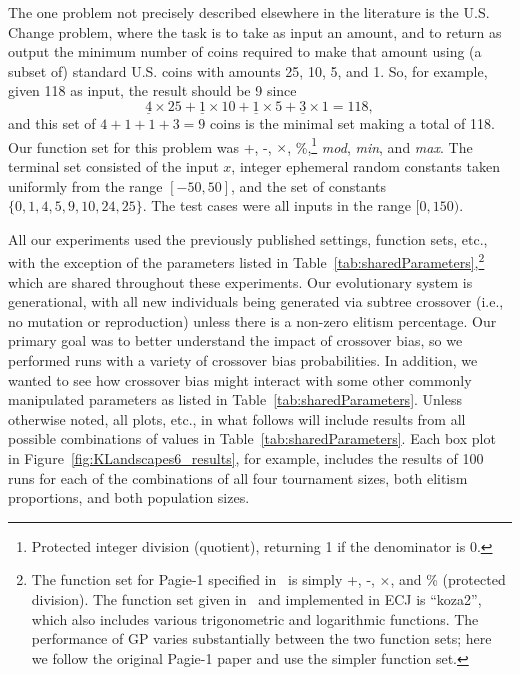 \documentclass{sig-alternate}
\begin{document}
The one problem not precisely described elsewhere in the literature is the U.S. Change problem, where the task is to
take as input an amount, and to return as output the minimum number of coins required to make that amount using (a
subset of) standard U.S. coins with amounts 25, 10, 5, and 1. So, for example, given 118 as input, the result should be
9 since 
\[
	\underline{4} \times 25 + \underline{1} \times 10 + \underline{1} \times 5 + \underline{3} \times 1 = 118,
\]
and this set of $4+1+1+3 = 9$ coins is the minimal set making a total of 118. Our function set for this problem was +,
-, $\times$, \%,\footnote{Protected integer division (quotient), returning 1 if the denominator is 0.} \emph{mod},
\emph{min}, and \emph{max}. The terminal set consisted of the input $x$, integer ephemeral random constants taken
uniformly from the range $[-50, 50]$, and the set of constants $\{ 0, 1, 4, 5, 9, 10, 24, 25 \}$. The test cases were
all inputs in the range $[0, 150)$.


All our experiments used the previously published settings, function sets, etc., with the exception of the parameters
listed in Table~\ref{tab:sharedParameters},\footnote{The function set for Pagie-1 specified
in~\cite{pagie1997evolutionary} is simply +, -, $\times$, and \% (protected division). The function set given
in~\cite{mcdermott2012genetic} and implemented in ECJ is ``koza2'', which also includes various trigonometric and
logarithmic functions. The performance of GP varies substantially between the two function sets; here we follow the
original Pagie-1 paper and use the simpler function set.} which are shared throughout these experiments. Our
evolutionary system is generational, with all new individuals being generated via subtree crossover (i.e., no mutation
or reproduction) unless there is a non-zero elitism percentage. Our primary goal was to better understand the impact of
crossover bias, so we performed runs with a variety of crossover bias probabilities. In addition, we wanted to see how
crossover bias might interact with some other commonly manipulated parameters as listed in
Table~\ref{tab:sharedParameters}. Unless otherwise noted, all plots, etc., in what follows will include results from
all possible combinations of values in Table~\ref{tab:sharedParameters}. Each box plot in
Figure~\ref{fig:KLandscapes6_results}, for example, includes the results of 100 runs for each of the combinations of
all four tournament sizes, both elitism proportions, and both population sizes.
\end{document}
